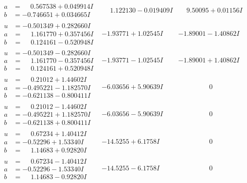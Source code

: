 \documentclass[1p]{elsarticle_modified}
\theoremstyle{definition}
\begin{document}
$$\begin{array}{c|c|c}
\begin{aligned}
a &= \phantom{-}0.567538 + 0.049914 I \\
b &= -0.746651 + 0.034665 I\end{aligned}
 & \phantom{-}1.122130 - 0.019409 I & \phantom{-}9.50095 + 0.01156 I \\ \hline\begin{aligned}
u &= -0.501349 + 0.282660 I \\
a &= \phantom{-}1.161770 + 0.357456 I \\
b &= \phantom{-}0.124161 - 0.520948 I\end{aligned}
 & -1.93771 + 1.02545 I & -1.89001 - 1.40862 I \\ \hline\begin{aligned}
u &= -0.501349 - 0.282660 I \\
a &= \phantom{-}1.161770 - 0.357456 I \\
b &= \phantom{-}0.124161 + 0.520948 I\end{aligned}
 & -1.93771 - 1.02545 I & -1.89001 + 1.40862 I \\ \hline\begin{aligned}
u &= \phantom{-}0.21012 + 1.44602 I \\
a &= -0.495221 - 1.182570 I \\
b &= -0.621138 - 0.800411 I\end{aligned}
 & -6.03656 + 5.90639 I & \phantom{-0.000000 } 0 \\ \hline\begin{aligned}
u &= \phantom{-}0.21012 - 1.44602 I \\
a &= -0.495221 + 1.182570 I \\
b &= -0.621138 + 0.800411 I\end{aligned}
 & -6.03656 - 5.90639 I & \phantom{-0.000000 } 0 \\ \hline\begin{aligned}
u &= \phantom{-}0.67234 + 1.40412 I \\
a &= -0.52296 + 1.53340 I \\
b &= \phantom{-}1.14683 + 0.92820 I\end{aligned}
 & -14.5255 + 6.1758 I & \phantom{-0.000000 } 0 \\ \hline\begin{aligned}
u &= \phantom{-}0.67234 - 1.40412 I \\
a &= -0.52296 - 1.53340 I \\
b &= \phantom{-}1.14683 - 0.92820 I\end{aligned}
 & -14.5255 - 6.1758 I & \phantom{-0.000000 } 0 \\ \hline\begin{aligned}

\end{aligned}
\end{array}$$
\end{document}
